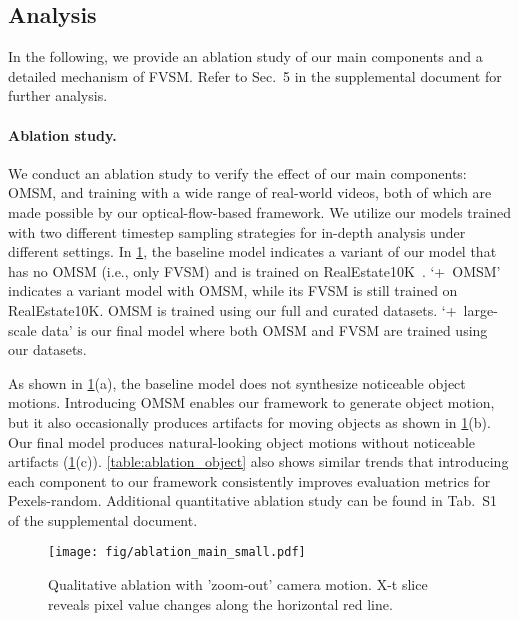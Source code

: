 \subsection{Analysis}
\label{sec:ablation_study}
In the following, we provide an ablation study of our main components and a detailed mechanism of FVSM. 
Refer to Sec.~5 in the supplemental document for further analysis.






\vspace{-3mm}
\paragraph{Ablation study.}
We conduct an ablation study to verify the effect of our main components: OMSM, and training with a wide range of real-world videos, both of which are made possible by our optical-flow-based framework.
We utilize our models trained with two different timestep sampling strategies for in-depth analysis under different settings.
In \cref{fig:ablation_main}, the baseline model indicates a variant of our model that has no OMSM (i.e., only FVSM) and is trained on RealEstate10K~\cite{zhou2018stereo}.
`+~OMSM' indicates a variant model with OMSM, while its FVSM is still trained on RealEstate10K.
OMSM is trained using our full and curated datasets.
`+~large-scale data' is our final model where both OMSM and FVSM are trained using our datasets.

As shown in \cref{fig:ablation_main}(a), the baseline model does not synthesize noticeable object motions.
Introducing OMSM enables our framework to generate object motion, but it also occasionally produces artifacts for moving objects as shown in \cref{fig:ablation_main}(b).
Our final model produces natural-looking object motions without noticeable artifacts (\cref{fig:ablation_main}(c)). \cref{table:ablation_object} also shows similar trends that introducing each component to our framework consistently improves evaluation metrics for Pexels-random.
Additional quantitative ablation study can be found in Tab.~S1 of the supplemental document.

\begin{figure}[!t]
\centering
\texttt{[image: fig/ablation\_main\_small.pdf]}
\vspace{-3.0mm}
\caption{
Qualitative ablation with 'zoom-out' camera motion. X-t slice reveals pixel value changes along the horizontal red line. 
}
\vspace{-3.5mm}
\label{fig:ablation_main}
\end{figure}

